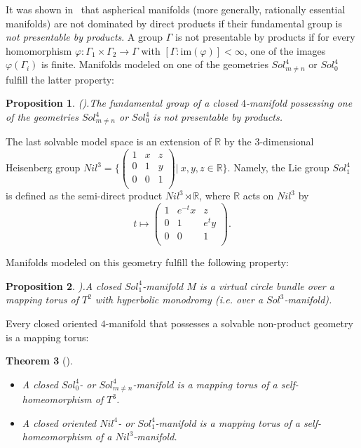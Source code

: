 \documentclass[12pt]{amsart}
\newtheorem{thm}{Theorem}[section]
\newtheorem{prop}[thm]{Proposition}
\theoremstyle{remark}
\begin{document}
It was shown in~\cite{KotschickLoeh1} that aspherical manifolds (more generally, rationally essential manifolds) are not dominated by direct products if their fundamental group is {\em not presentable by products}. A group $\Gamma$ is not presentable by products if for every homomorphism $\varphi\colon\Gamma_1\times\Gamma_2\longrightarrow\Gamma$ with $[\Gamma:\mathrm{im}(\varphi)]<\infty$, one of the images $\varphi(\Gamma_i)$ is finite. Manifolds modeled on one of the geometries $Sol_{m\neq n}^4$ or $Sol_0^4$ fulfill the latter property:

\begin{prop}{\normalfont (\cite[Prop. 6.13]{NeoIIPP}).}\label{p:sol&sol}
The fundamental group of a closed $4$-manifold possessing one of the geometries $Sol_{m\neq n}^4$ or $Sol_0^4$ is not presentable by products.
\end{prop}

The last solvable model space is an extension of ${\mathbb{R}}$ by the $3$-dimensional Heisenberg group
$
 Nil^3 = 
\Biggl\{ \left( \begin{array}{ccc}
  1 & x & z \\
  0 & 1 & y \\
  0 & 0 & 1 \\
\end{array} \right) \biggl\vert
\ x,y,z \in {\mathbb{R}} \Biggl\}.
$
Namely, the Lie group $Sol_1^4$ is defined as the semi-direct product $Nil^3 \rtimes {\mathbb{R}}$, where ${\mathbb{R}}$ acts on $Nil^3$ by
\[
t \mapsto 
\left(\begin{array}{ccc}
   1 & e^{-t}x & z \\
   0 & 1 & e^{t}y \\
   0 & 0 & 1 \\
\end{array} \right).
\]

Manifolds modeled on this geometry fulfill the following property:

\begin{prop}{\normalfont \cite[Prop. 6.15]{NeoIIPP}).}\label{p:sol1}
A closed $Sol_1^4$-manifold $M$ is a virtual circle bundle over a mapping torus of $T^2$ with hyperbolic monodromy (i.e. over a $Sol^3$-manifold).
\end{prop}

Every closed oriented $4$-manifold that possesses a solvable non-product geometry is a mapping torus:

\begin{thm}[]\label{t:mappingtorisolvable} \
 \begin{itemize}
  \item[\normalfont{(1)}] A closed $Sol_0^4$- or $Sol_{m \neq n}^4$-manifold is a mapping torus of a self-homeomorphism of $T^3$.
  \item[\normalfont{(2)}] A closed oriented $Nil^4$- or $Sol_1^4$-manifold is a mapping torus of a self-homeomorphism of a $Nil^3$-manifold.
 \end{itemize}
\end{thm}
\end{document}
